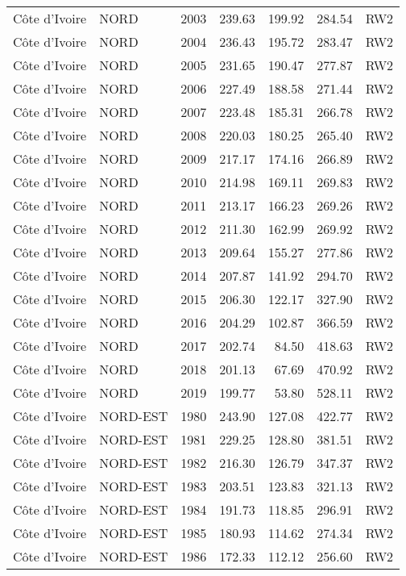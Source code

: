 \begin{longtable}{lllrrrl}
  C\^{o}te d'Ivoire & NORD & 2003 & 239.63 & 199.92 & 284.54 & RW2 \\ 
  C\^{o}te d'Ivoire & NORD & 2004 & 236.43 & 195.72 & 283.47 & RW2 \\ 
  C\^{o}te d'Ivoire & NORD & 2005 & 231.65 & 190.47 & 277.87 & RW2 \\ 
  C\^{o}te d'Ivoire & NORD & 2006 & 227.49 & 188.58 & 271.44 & RW2 \\ 
  C\^{o}te d'Ivoire & NORD & 2007 & 223.48 & 185.31 & 266.78 & RW2 \\ 
  C\^{o}te d'Ivoire & NORD & 2008 & 220.03 & 180.25 & 265.40 & RW2 \\ 
  C\^{o}te d'Ivoire & NORD & 2009 & 217.17 & 174.16 & 266.89 & RW2 \\ 
  C\^{o}te d'Ivoire & NORD & 2010 & 214.98 & 169.11 & 269.83 & RW2 \\ 
  C\^{o}te d'Ivoire & NORD & 2011 & 213.17 & 166.23 & 269.26 & RW2 \\ 
  C\^{o}te d'Ivoire & NORD & 2012 & 211.30 & 162.99 & 269.92 & RW2 \\ 
  C\^{o}te d'Ivoire & NORD & 2013 & 209.64 & 155.27 & 277.86 & RW2 \\ 
  C\^{o}te d'Ivoire & NORD & 2014 & 207.87 & 141.92 & 294.70 & RW2 \\ 
  C\^{o}te d'Ivoire & NORD & 2015 & 206.30 & 122.17 & 327.90 & RW2 \\ 
  C\^{o}te d'Ivoire & NORD & 2016 & 204.29 & 102.87 & 366.59 & RW2 \\ 
  C\^{o}te d'Ivoire & NORD & 2017 & 202.74 & 84.50 & 418.63 & RW2 \\ 
  C\^{o}te d'Ivoire & NORD & 2018 & 201.13 & 67.69 & 470.92 & RW2 \\ 
  C\^{o}te d'Ivoire & NORD & 2019 & 199.77 & 53.80 & 528.11 & RW2 \\ 
  C\^{o}te d'Ivoire & NORD-EST & 1980 & 243.90 & 127.08 & 422.77 & RW2 \\ 
  C\^{o}te d'Ivoire & NORD-EST & 1981 & 229.25 & 128.80 & 381.51 & RW2 \\ 
  C\^{o}te d'Ivoire & NORD-EST & 1982 & 216.30 & 126.79 & 347.37 & RW2 \\ 
  C\^{o}te d'Ivoire & NORD-EST & 1983 & 203.51 & 123.83 & 321.13 & RW2 \\ 
  C\^{o}te d'Ivoire & NORD-EST & 1984 & 191.73 & 118.85 & 296.91 & RW2 \\ 
  C\^{o}te d'Ivoire & NORD-EST & 1985 & 180.93 & 114.62 & 274.34 & RW2 \\ 
  C\^{o}te d'Ivoire & NORD-EST & 1986 & 172.33 & 112.12 & 256.60 & RW2 \\ 

\end{longtable}
